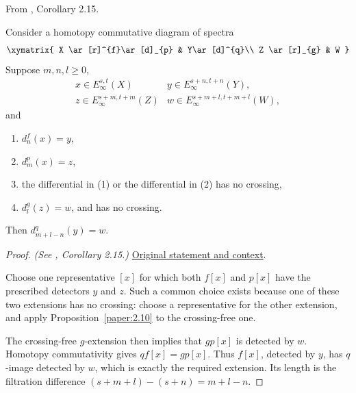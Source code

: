 \begin{corollary}
\label{paper:2.15}
From \cite{LWX126}, Corollary 2.15.\par
\label{cor:0012nik}
    Consider a homotopy commutative diagram of spectra
    $$\xymatrix{
    X \ar[r]^{f}\ar[d]_{p} & Y\ar[d]^{q}\\
    Z \ar[r]_{g} & W
    }$$
    Suppose $m,n,l\ge 0$, 
    $$\begin{array}{ll}
        x\in E^{s,t}_\infty(X) & y\in E^{s+n,t+n}_\infty(Y),\\
        z\in E^{s+m,t+m}_\infty(Z) & w\in E^{s+m+l,t+m+l}_\infty(W),
    \end{array}$$
    and
    \begin{enumerate}
        \item $d^{f}_{n}(x)=y$,
        \item $d^{p}_{m}(x)=z$,
        \item the differential in (1) or the differential in (2) has no crossing,
        \item $d^{g}_{l}(z)=w$, and has no crossing.
    \end{enumerate}
    Then $d^{q}_{m+l-n}(y)=w$.

\end{corollary}
\begin{proof}
\textit{(See \cite{LWX126}, Corollary 2.15.)} \href{paper/main.tex.html#L555}{Original statement and context}.

Choose one representative $[x]$ for which both $f[x]$ and $p[x]$ have the prescribed detectors $y$ and $z$. Such a common choice exists because one of these two extensions has no crossing: choose a representative for the other extension, and apply Proposition~\ref{paper:2.10} to the crossing-free one.

The crossing-free $g$-extension then implies that $gp[x]$ is detected by $w$. Homotopy commutativity gives $qf[x]=gp[x]$. Thus $f[x]$, detected by $y$, has $q$-image detected by $w$, which is exactly the required extension. Its length is the filtration difference $(s+m+l)-(s+n)=m+l-n$.
\end{proof}


